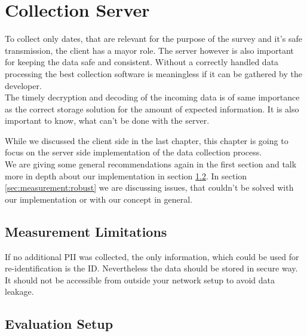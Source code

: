 \chapter{Collection Server}
\label{chap:mmeasurement}
To collect only dates, that are relevant for the purpose of the survey and it's safe transmission, the client has a mayor role. The server however is also important for keeping the data safe and consistent. Without a correctly handled data processing the best collection software is meaningless if it can be gathered by the developer.\\
The timely decryption and decoding of the incoming data is of same importance as the correct storage solution for the amount of expected information. It is also important to know, what can't be done with the server.

While we discussed the client side in the last chapter, this chapter is going to focus on
the server side implementation of the data collection process.\\
We are giving some general recommendations again in the first section and talk more in depth about our implementation in section \ref{sec:measurement:eval_setup}.
In section \ref{sec:measurement:robust} we are discussing issues, that couldn't be solved with our implementation or with our concept in general.
%


\section{Measurement Limitations}
\label{sec:measurement:limits}
%
If no additional PII was collected, the only information, which could be used for re-identification is the ID. 
Nevertheless the data should be stored in secure way. It should not be accessible from outside your network setup to avoid data leakage. 
%

\section{Evaluation Setup}
\label{sec:measurement:eval_setup}
%


%
\newpage
%
 


